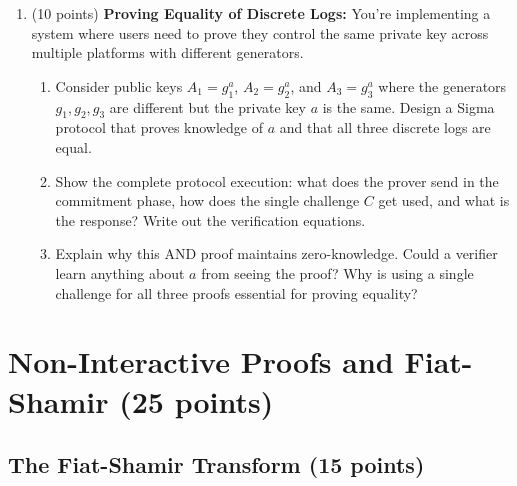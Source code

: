 \documentclass[10pt,a4paper,american]{article}
\begin{document}
\begin{enumerate}
	\item (10 points) \textbf{Proving Equality of Discrete Logs:}
	      You're implementing a system where users need to prove they control the same private key across multiple platforms with different generators.
	      \begin{enumerate}
		      \item Consider public keys $A_1 = g_1^a$, $A_2 = g_2^a$, and $A_3 = g_3^a$ where the generators $g_1, g_2, g_3$ are different but the private key $a$ is the same. Design a Sigma protocol that proves knowledge of $a$ and that all three discrete logs are equal.
		      \item Show the complete protocol execution: what does the prover send in the commitment phase, how does the single challenge $C$ get used, and what is the response? Write out the verification equations.
		      \item Explain why this AND proof maintains zero-knowledge. Could a verifier learn anything about $a$ from seeing the proof? Why is using a single challenge for all three proofs essential for proving equality?
	      \end{enumerate}
\end{enumerate}

\section{Non-Interactive Proofs and Fiat-Shamir (25 points)}

\subsection{The Fiat-Shamir Transform (15 points)}
\end{document}
